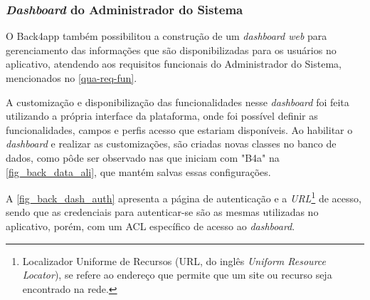 \newpage

\subsubsection{\emph{Dashboard} do Administrador do Sistema}

O Back4app também possibilitou a construção de um \emph{dashboard web} para gerenciamento das informações que são disponibilizadas
para os usuários no aplicativo, atendendo aos requisitos funcionais do Administrador do Sistema, mencionados no \autoref{qua-req-fun}.

A customização e disponibilização das funcionalidades nesse \emph{dashboard} foi feita utilizando a própria
interface da plataforma, onde foi possível definir as funcionalidades, campos e perfis acesso que estariam
disponíveis. Ao habilitar o \emph{dashboard} e realizar as customizações, são criadas novas classes no banco
de dados, como pôde ser observado nas que iniciam com "B4a" na \autoref{fig_back_data_ali}, que mantém salvas
essas configurações.

A \autoref{fig_back_dash_auth} apresenta a página de autenticação e a \emph{URL}\footnote{Localizador Uniforme de Recursos 
(URL, do inglês \emph{Uniform Resource Locator}), se refere ao endereço que permite que um site ou recurso seja encontrado na rede.}
de acesso, sendo que as credenciais para autenticar-se são as mesmas utilizadas no aplicativo, porém, com um ACL específico de acesso ao \emph{dashboard}.


